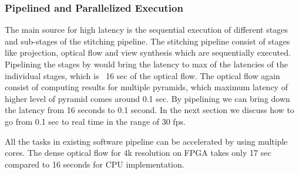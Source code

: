 \subsubsection{Pipelined and Parallelized Execution}
The main source for high latency is the sequential execution of different stages and sub-stages of the stitching pipeline. The stitching pipeline consist of stages like projection, optical flow and view synthesis which are sequentially executed. Pipelining the stages by would bring the latency to max of the latencies of the individual stages, which is ~16 sec of the optical flow. The optical flow again consist of computing results for multiple pyramids, which maximum latency of higher level of pyramid comes around 0.1 sec. By pipelining we can bring down the latency from 16 seconds to 0.1 second. In the next section we discuss how to go from 0.1 sec to real time in the range of 30 fps. \newline

All the tasks in existing software pipeline can be accelerated by using multiple cores. The dense optical flow for 4k resolution on FPGA takes only 17 sec compared to 16 seconds for CPU implementation. 

